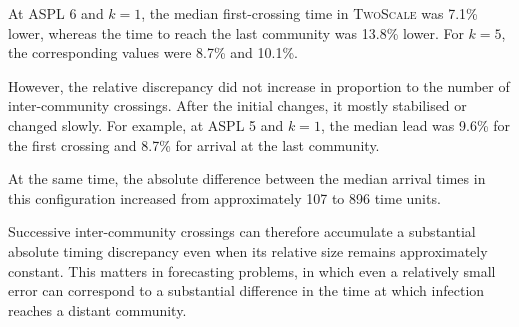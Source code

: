 \documentclass[a4paper,fleqn]{cas-sc}
\newcommand{\TS}{\textup{\textsc{TwoScale}}}
\begin{document}
At ASPL 6 and $k=1$, the median first-crossing time in \TS{} was 7.1\% lower, whereas the time to reach the last community was 13.8\% lower. For $k=5$, the corresponding values were 8.7\% and 10.1\%.

However, the relative discrepancy did not increase in proportion to the number of inter-community crossings. After the initial changes, it mostly stabilised or changed slowly. For example, at ASPL 5 and $k=1$, the median lead was 9.6\% for the first crossing and 8.7\% for arrival at the last community.

At the same time, the absolute difference between the median arrival times in this configuration increased from approximately 107 to 896 time units.

Successive inter-community crossings can therefore accumulate a substantial absolute timing discrepancy even when its relative size remains approximately constant. This matters in forecasting problems, in which even a relatively small error can correspond to a substantial difference in the time at which infection reaches a distant community.
\end{document}
